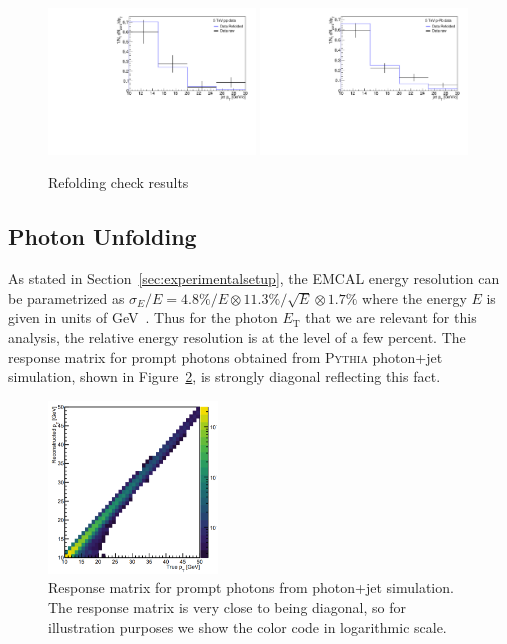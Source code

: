 \begin{figure}
\center
\includegraphics[width=0.49\textwidth]{JetResponse/RefoldingCheck_pp}
\includegraphics[width=0.49\textwidth]{JetResponse/RefoldingCheck_pPb}
\label{fig:Refolding}
\caption{Refolding check results}
\end{figure}

\FloatBarrier
\subsection{Photon Unfolding}
As stated in Section~\ref{sec:experimentalsetup}, the EMCAL energy resolution can be parametrized as $\sigma_{E}/E = 4.8\%/E\otimes 11.3\%/\sqrt{E}\otimes 1.7\%$ where the energy $E$ is given in units of GeV~\cite{Abeysekara:2010ze}. Thus for the photon $E_{\mathrm{T}}$ that we are relevant for this analysis, the relative energy resolution is at the level of a few percent. The response matrix for prompt photons obtained from \textsc{Pythia} photon+jet simulation, shown in Figure~\ref{fig:photonunfolding}, is strongly diagonal reflecting this fact.  
\begin{figure}
\centering
\includegraphics[width=0.40\textwidth]{JetResponse/PHOTONMATRIX}
\caption{Response matrix for prompt photons from photon+jet simulation. The response matrix is very close to being diagonal, so for illustration purposes we show the color code in logarithmic scale.}
\label{fig:photonunfolding}
\end{figure}

